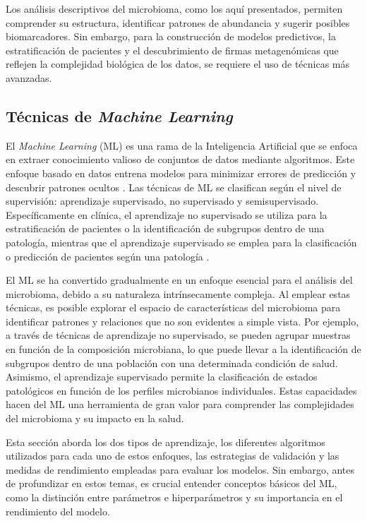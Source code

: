 
Los análisis descriptivos del microbioma, como los aquí presentados, permiten comprender su estructura, identificar patrones de abundancia y sugerir posibles biomarcadores. Sin embargo, para la construcción de modelos predictivos, la estratificación de pacientes y el descubrimiento de firmas metagenómicas que reflejen la complejidad biológica de los datos, se requiere el uso de técnicas más avanzadas.

\subsection{Técnicas de \textit{Machine Learning}}

El \textit{Machine Learning} (ML) es una rama de la Inteligencia Artificial que se enfoca en extraer conocimiento valioso de conjuntos de datos mediante algoritmos. Este enfoque basado en datos entrena modelos para minimizar errores de predicción y descubrir patrones ocultos \cite{mitchell1997machine}. Las técnicas de ML se clasifican según el nivel de supervisión: aprendizaje supervisado, no supervisado y semisupervisado. Específicamente en clínica, el aprendizaje no supervisado se utiliza para la estratificación de pacientes o la identificación de subgrupos dentro de una patología, mientras que el aprendizaje supervisado se emplea para la clasificación o predicción de pacientes según una patología \cite{bishop2006pattern, deo2015machine}.

El ML se ha convertido gradualmente en un enfoque esencial para el análisis del microbioma, debido a su naturaleza intrínsecamente compleja. Al emplear estas técnicas, es posible explorar el espacio de características del microbioma para identificar patrones y relaciones que no son evidentes a simple vista. Por ejemplo, a través de técnicas de aprendizaje no supervisado, se pueden agrupar muestras en función de la composición microbiana, lo que puede llevar a la identificación de subgrupos dentro de una población con una determinada condición de salud. Asimismo, el aprendizaje supervisado permite la clasificación de estados patológicos en función de los perfiles microbianos individuales. Estas capacidades hacen del ML una herramienta de gran valor para comprender las complejidades del microbioma y su impacto en la salud.

Esta sección aborda los dos tipos de aprendizaje, los diferentes algoritmos utilizados para cada uno de estos enfoques, las estrategias de validación y las medidas de rendimiento empleadas para evaluar los modelos. Sin embargo, antes de profundizar en estos temas, es crucial entender conceptos básicos del ML, como la distinción entre parámetros e hiperparámetros y su importancia en el rendimiento del modelo.


